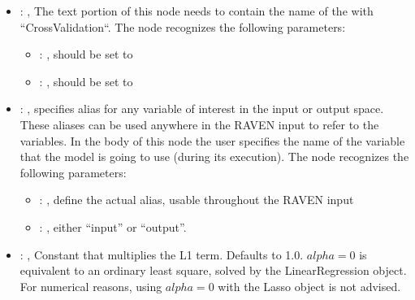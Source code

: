 \begin{itemize}
\begin{itemize}
        \item {}: ,
          List of IDs of features/variables to include in the transformation process.

        \item {}: ,
          Which space to search? Target or Feature?
      \end{itemize}

    \item {}: ,
      The text portion of this node needs to contain the name of the  with
               ``CrossValidation``.
      The  node recognizes the following parameters:
        \begin{itemize}
          \item {}: ,
            should be set to 
          \item {}: ,
            should be set to 
      \end{itemize}

    \item {}: ,
      specifies alias for         any variable of interest in the input or output space. These
      aliases can be used anywhere in the RAVEN input to         refer to the variables. In the body
      of this node the user specifies the name of the variable that the model is going to use
      (during its execution).
      The  node recognizes the following parameters:
        \begin{itemize}
          \item {}: ,
            define the actual alias, usable throughout the RAVEN input
          \item {}: ,
            either ``input'' or ``output''.
      \end{itemize}

    \item {}: ,
      Constant that multiplies the L1 term. Defaults to 1.0.
      $alpha = 0$ is equivalent to an ordinary least square, solved by
      the LinearRegression object. For numerical reasons, using $alpha = 0$
      with the Lasso object is not advised.


\end{itemize}
